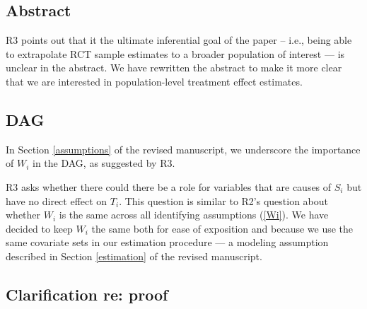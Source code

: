 \documentclass[hidelinks,12pt,letterpaper]{article}
\begin{document}
\subsection{Abstract}


R3 points out that it the ultimate inferential goal of the paper -- i.e., being able to extrapolate RCT sample estimates to a broader population of interest --- is unclear in the abstract. We have rewritten the abstract to make it more clear that we are interested in population-level treatment effect estimates. 

\subsection{DAG}


In Section \ref{assumptions} of the revised manuscript, we underscore the importance of $W_i$ in the DAG, as suggested by R3.


R3 asks whether there could there be a role for variables that are causes of $S_i$ but have no direct effect on $T_i$. This question is similar to R2's question about whether $W_i$ is the same across all identifying assumptions (\ref{Wi}). We have decided to keep $W_i$ the same both for ease of exposition and because we use the same covariate sets in our estimation procedure --- a modeling assumption described in Section \ref{estimation} of the revised manuscript. 

\subsection{Clarification re: proof}
\end{document}
